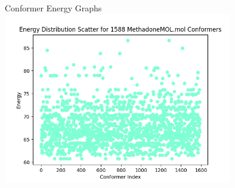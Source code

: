 \documentclass[aspectratio=169]{beamer}
\begin{document}
\begin{frame}{Conformer Energy Graphs}
\includegraphics[width=10cm]{img/Graphs/MethadoneMOL_Energy_Scatter.png}
\end{frame}
\end{document}
